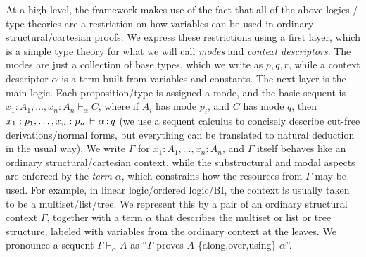 \documentclass[a4paper,USenglish]{lipics-v2016}
\newcommand\seq[3]{\ensuremath{#1 \vdash_{#2} #3}}
\renewcommand{\oftp}[3]{\ensuremath{#1 \, \vdash #2 \, \dcd{:} \, #3}}
\begin{document}
At a high level, the framework makes use of the fact that all of the
above logics / type theories are a restriction on how variables can be
used in ordinary structural/cartesian proofs.  We express these
restrictions using a first layer, which is a simple type theory for what
we will call \emph{modes} and \emph{context descriptors}.  The modes are
just a collection of base types, which we write as $p,q,r$, while a
context descriptor $\alpha$ is a term built from variables and
constants.  The next layer is the main logic.  Each proposition/type is
assigned a mode, and the basic sequent is \seq{x_1 : A_1, \ldots, x_n :
  A_n}{\alpha}{C}, where if $A_i$ has mode $p_i$, and $C$ has mode $q$,
then $\oftp{x_1 : p_1,\ldots, x_n : p_n}{\alpha}{q}$ (we use a sequent
calculus to concisely describe cut-free derivations/normal forms, but
everything can be translated to natural deduction in the usual way).  We
write ${\Gamma}$ for $x_1 : A_1, \ldots, x_n : A_n$, and $\Gamma$ itself
behaves like an ordinary structural/cartesian context, while the
substructural and modal aspects are enforced by the \emph{term}
$\alpha$, which constrains how the resources from $\Gamma$ may be used.
For example, in linear logic/ordered logic/BI, the context is usually
taken to be a multiset/list/tree.  We represent this by a pair of an
ordinary structural context $\Gamma$, together with a term $\alpha$ that
describes the multiset or list or tree structure, labeled with variables
from the ordinary context at the leaves.  We pronounce a sequent
\seq{\Gamma}{\alpha}{A} as ``$\Gamma$ proves $A$ \{along,over,using\}
$\alpha$''.
\end{document}
